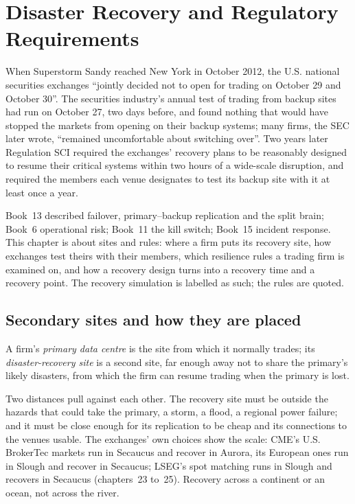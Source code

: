 \chapter{Disaster Recovery and Regulatory Requirements}\label{ch:nw:disaster-recovery-and-regulatory-requirements}

When Superstorm Sandy reached New York in October 2012, the U.S. national securities exchanges ``jointly decided not to open
for trading on October 29 and October 30''. The securities industry's annual test of trading from backup sites had run on
October 27, two days before, and found nothing that would have stopped the markets from opening on their backup systems; many
firms, the SEC later wrote, ``remained uncomfortable about switching over''. Two years later Regulation SCI required the
exchanges' recovery plans to be reasonably designed to resume their critical systems within two hours of a wide-scale
disruption, and required the members each venue designates to test its backup site with it at least once a year.

Book~13 described failover, primary--backup replication and the split brain; Book~6 operational risk; Book~11 the kill
switch; Book~15 incident response. This chapter is about sites and rules: where a firm puts its recovery site, how exchanges
test theirs with their members, which resilience rules a trading firm is examined on, and how a recovery design turns into a
recovery time and a recovery point. The recovery simulation is labelled as such; the rules are quoted.

\section{Secondary sites and how they are placed}

\begin{definition}\label{def:nw:disaster-recovery-and-regulatory-requirements:sites}
A firm's \emph{primary data centre} is the site from which it normally trades; its
\emph{disaster-recovery site} is a second site, far enough away not to share the primary's likely
disasters, from which the firm can resume trading when the primary is lost.
\end{definition}

Two distances pull against each other. The recovery site must be outside the hazards that could take the primary, a storm, a
flood, a regional power failure; and it must be close enough for its replication to be cheap and its connections to the venues
usable. The exchanges' own choices show the scale: CME's U.S. BrokerTec markets run in Secaucus and recover in Aurora, its
European ones run in Slough and recover in Secaucus; LSEG's spot matching runs in Slough and recovers in Secaucus
(chapters~23 to~25). Recovery across a continent or an ocean, not across the river.

